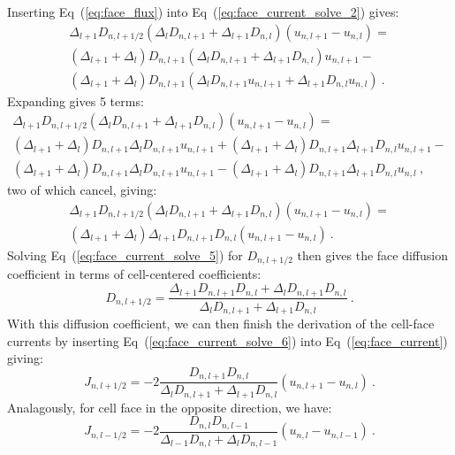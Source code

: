 Inserting Eq~(\ref{eq:face_flux}) into
Eq~(\ref{eq:face_current_solve_2}) gives:
\begin{multline}
  \Delta_{l+1} D_{n,l+1/2} (\Delta_l D_{n,l+1} + \Delta_{l+1} D_{n,l})
  (u_{n,l+1} - u_{n,l}) = \\(\Delta_{l+1} + \Delta_l) D_{n,l+1}
  (\Delta_l D_{n,l+1} + \Delta_{l+1} D_{n,l}) u_{n,l+1} -\\
  (\Delta_{l+1} + \Delta_l) D_{n,l+1}(\Delta_l D_{n,l+1} u_{n,l+1} +
  \Delta_{l+1} D_{n,l} u_{n,l})\:.
  \label{eq:face_current_solve_3}
\end{multline}
Expanding gives 5 terms:
\begin{multline}
  \Delta_{l+1} D_{n,l+1/2} (\Delta_l D_{n,l+1} + \Delta_{l+1} D_{n,l})
  (u_{n,l+1} - u_{n,l}) = \\(\Delta_{l+1} + \Delta_l) D_{n,l+1}
  \Delta_l D_{n,l+1} u_{n,l+1} + (\Delta_{l+1} + \Delta_l) D_{n,l+1}
  \Delta_{l+1} D_{n,l} u_{n,l+1} -\\ (\Delta_{l+1} + \Delta_l)
  D_{n,l+1} \Delta_l D_{n,l+1} u_{n,l+1} - (\Delta_{l+1} + \Delta_l)
  D_{n,l+1} \Delta_{l+1} D_{n,l} u_{n,l}\:,
  \label{eq:face_current_solve_4}
\end{multline}
two of which cancel, giving:
\begin{multline}
  \Delta_{l+1} D_{n,l+1/2} (\Delta_l D_{n,l+1} + \Delta_{l+1} D_{n,l})
  (u_{n,l+1} - u_{n,l}) = \\(\Delta_{l+1} + \Delta_l) \Delta_{l+1}
  D_{n,l+1} D_{n,l} ( u_{n,l+1} - u_{n,l} ) \:.
  \label{eq:face_current_solve_5}
\end{multline}
Solving Eq~(\ref{eq:face_current_solve_5}) for $D_{n,l+1/2}$ then
gives the face diffusion coefficient in terms of cell-centered
coefficients:
\begin{equation}
  D_{n,l+1/2} = \frac{\Delta_{l+1} D_{n,l+1} D_{n,l} + \Delta_l
    D_{n,l+1} D_{n,l}}{\Delta_l D_{n,l+1} + \Delta_{l+1} D_{n,l}} \:.
  \label{eq:face_current_solve_6}
\end{equation}
With this diffusion coefficient, we can then finish the derivation of
the cell-face currents by inserting Eq~(\ref{eq:face_current_solve_6})
into Eq~(\ref{eq:face_current}) giving:
\begin{equation}
  J_{n,l+1/2} = -2 \frac{D_{n,l+1} D_{n,l}}{\Delta_l D_{n,l+1} +
    \Delta_{l+1} D_{n,l}} (u_{n,l+1} - u_{n,l})\:.
  \label{eq:face_current_solve_7}
\end{equation}
Analagously, for cell face in the opposite direction, we have:
\begin{equation}
  J_{n,l-1/2} = -2 \frac{D_{n,l} D_{n,l-1}}{\Delta_{l-1} D_{n,l} +
    \Delta_{l} D_{n,l-1}} (u_{n,l} - u_{n,l-1})\:.
  \label{eq:face_current_solve_8}
\end{equation}

